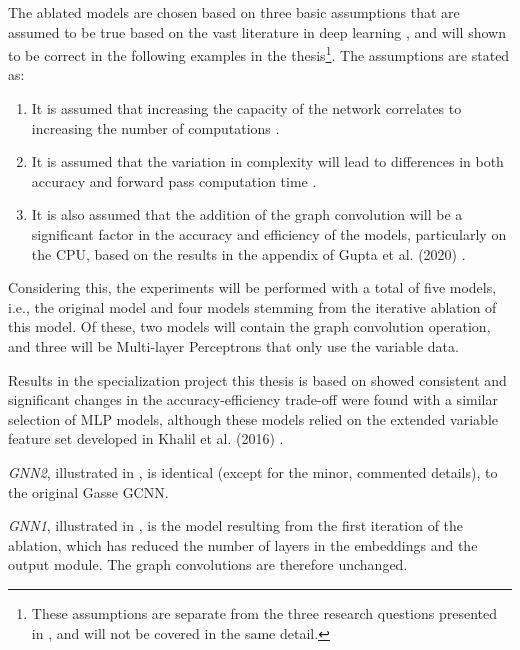 The ablated models are chosen based on three basic assumptions that are assumed to be true based on the vast literature in deep learning \cite{goodfellow2016deep}, and will shown to be correct in the following examples in the thesis\footnote{These assumptions are separate from the three research questions presented in , and will not be covered in the same detail.}. The assumptions are stated as: 


\begin{enumerate}[label=(\roman*)]
    \item  It is assumed that increasing the capacity of the network correlates to increasing the number of computations \cite{goodfellow2016deep}. 
    \item  It is assumed that the variation in complexity will lead to differences in both accuracy and forward pass computation time \cite{goodfellow2016deep}. 
    \item  It is also assumed that the addition of the graph convolution will be a significant factor in the accuracy and efficiency of the models, particularly on the \gls{CPU}, based on the results in the appendix of Gupta et al. (2020) \cite{gupta2020hybrid}.
\end{enumerate}

Considering this, the experiments will be performed with a total of five models, i.e., the original model and four models stemming from the iterative ablation of this model. Of these, two models will contain the graph convolution operation, and three will be Multi-layer Perceptrons that only use the variable data. 

Results in the specialization project this thesis is based on showed consistent and significant changes in the accuracy-efficiency trade-off were found with a similar selection of \gls{MLP} models, although these models relied on the extended variable feature set developed in Khalil et al. (2016) \cite{khalil2016learning}.

\textit{GNN2}, illustrated in , is identical (except for the minor, commented details), to the original Gasse \gls{GCNN}.  

\textit{GNN1}, illustrated in , is the model resulting from the first iteration of the ablation, which has reduced the number of layers in the embeddings and the output module. The graph convolutions are therefore unchanged.

